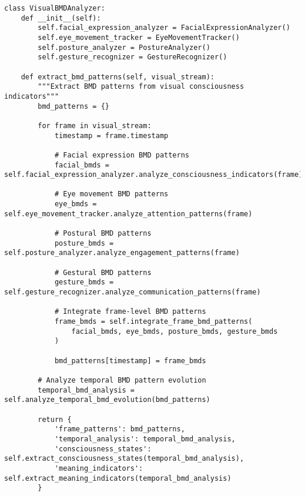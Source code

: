 \documentclass[12pt,a4paper]{article}
\begin{document}
\begin{lstlisting}[style=pythonstyle, caption=Visual BMD Pattern Recognition]
class VisualBMDAnalyzer:
    def __init__(self):
        self.facial_expression_analyzer = FacialExpressionAnalyzer()
        self.eye_movement_tracker = EyeMovementTracker()
        self.posture_analyzer = PostureAnalyzer()
        self.gesture_recognizer = GestureRecognizer()
        
    def extract_bmd_patterns(self, visual_stream):
        """Extract BMD patterns from visual consciousness indicators"""
        bmd_patterns = {}
        
        for frame in visual_stream:
            timestamp = frame.timestamp
            
            # Facial expression BMD patterns
            facial_bmds = self.facial_expression_analyzer.analyze_consciousness_indicators(frame)
            
            # Eye movement BMD patterns
            eye_bmds = self.eye_movement_tracker.analyze_attention_patterns(frame)
            
            # Postural BMD patterns
            posture_bmds = self.posture_analyzer.analyze_engagement_patterns(frame)
            
            # Gestural BMD patterns
            gesture_bmds = self.gesture_recognizer.analyze_communication_patterns(frame)
            
            # Integrate frame-level BMD patterns
            frame_bmds = self.integrate_frame_bmd_patterns(
                facial_bmds, eye_bmds, posture_bmds, gesture_bmds
            )
            
            bmd_patterns[timestamp] = frame_bmds
        
        # Analyze temporal BMD pattern evolution
        temporal_bmd_analysis = self.analyze_temporal_bmd_evolution(bmd_patterns)
        
        return {
            'frame_patterns': bmd_patterns,
            'temporal_analysis': temporal_bmd_analysis,
            'consciousness_states': self.extract_consciousness_states(temporal_bmd_analysis),
            'meaning_indicators': self.extract_meaning_indicators(temporal_bmd_analysis)
        }
    

\end{lstlisting}
\end{document}
